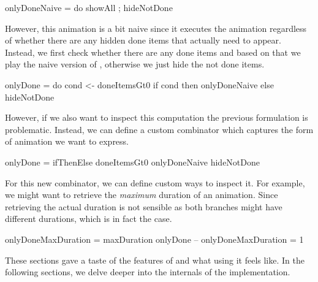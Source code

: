 \begin{spec}
onlyDoneNaive = do showAll ; hideNotDone
\end{spec}

However, this animation is a bit naive since it executes the  animation regardless of whether there are any hidden done items that actually need to appear. Instead, we first check whether there are any done items and based on that we play the naive version of , otherwise we just hide the not done items.

\begin{spec}
onlyDone = do
  cond <- doneItemsGt0
  if cond
    then onlyDoneNaive
    else hideNotDone
\end{spec}

However, if we also want to inspect this computation the previous formulation is problematic. Instead, we can define a custom combinator  which captures the form of animation we want to express.

\begin{spec}
onlyDone = ifThenElse doneItemsGt0
  onlyDoneNaive
  hideNotDone
\end{spec}

For this new combinator, we can define custom ways to inspect it. For example, we might want to retrieve the \emph{maximum} duration of an animation. Since retrieving the actual duration is not sensible as both branches might have different durations, which is in fact the case.

\begin{spec}
onlyDoneMaxDuration = maxDuration onlyDone
-- onlyDoneMaxDuration = 1
\end{spec}

These sections gave a taste of the features of \dsl{} and what using it feels like. In the following sections, we delve deeper into the internals of the implementation.
